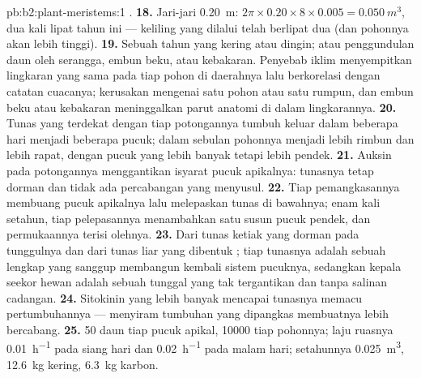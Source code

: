 \begin{solution}{pb:b2:plant-meristems:1}
.
\textbf{18.} Jari-jari \qty{0.20}{m}: $2\pi\times 0.20\times 8\times
0.005 = \qty{0.050}{m^3}$, dua kali lipat tahun ini --- keliling yang
dilalui  telah berlipat dua (dan pohonnya akan lebih tinggi).
\textbf{19.} Sebuah tahun yang kering atau dingin; atau penggundulan
daun oleh serangga, embun beku, atau kebakaran. Penyebab iklim
menyempitkan lingkaran yang sama pada tiap pohon di daerahnya lalu
berkorelasi dengan catatan cuacanya; kerusakan mengenai satu pohon atau
satu rumpun, dan embun beku atau kebakaran meninggalkan parut anatomi
di dalam lingkarannya.
\textbf{20.} Tunas yang terdekat dengan tiap potongannya tumbuh keluar
dalam beberapa hari menjadi beberapa pucuk; dalam sebulan pohonnya
menjadi lebih rimbun dan lebih rapat, dengan pucuk yang lebih banyak
tetapi lebih pendek.
\textbf{21.} Auksin pada potongannya menggantikan isyarat pucuk
apikalnya: tunasnya tetap dorman dan tidak ada percabangan yang
menyusul.
\textbf{22.} Tiap pemangkasannya membuang pucuk apikalnya lalu
melepaskan tunas di bawahnya; enam kali setahun, tiap pelepasannya
menambahkan satu susun pucuk pendek, dan permukaannya terisi olehnya.
\textbf{23.} Dari tunas ketiak yang dorman pada tunggulnya dan dari
tunas liar yang dibentuk ; tiap tunasnya adalah sebuah
 lengkap yang sanggup membangun kembali sistem pucuknya,
sedangkan kepala seekor hewan adalah sebuah  tunggal yang tak
tergantikan dan tanpa salinan cadangan.
\textbf{24.} Sitokinin yang lebih banyak mencapai tunasnya memacu
pertumbuhannya --- menyiram tumbuhan yang dipangkas membuatnya lebih
bercabang.
\textbf{25.} 50 daun tiap pucuk apikal, \num{10000} tiap pohonnya; laju
ruasnya \qty{0.01}{h^{-1}} pada siang hari dan \qty{0.02}{h^{-1}} pada
malam hari;  setahunnya \qty{0.025}{m^3}, \qty{12.6}{kg} kering,
\qty{6.3}{kg} karbon.
\end{solution}
